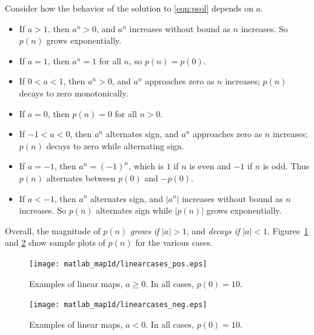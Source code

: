 % 
Consider how the behavior of the solution
to \eqref{eqn:psol} depends on $a$.
\begin{itemize}
\item If $a > 1$, then $a^n > 0$, and $a^n$ increases without
bound as $n$ increases. So $p(n)$ grows exponentially.
\item If $a = 1$, then $a^n=1$ for all $n$, so $p(n) = p(0)$.
\item If $0 < a < 1$, then $a^n > 0$, and $a^n$ approaches
zero as $n$ increases; $p(n)$ decays to zero monotonically.
\item If $a=0$, then $p(n)=0$ for all $n > 0$.
\item If $-1 < a < 0$, then $a^n$ alternates sign, and
$a^n$ approaches zero as $n$ increases;
$p(n)$  decays to zero while alternating sign.
\item If $a = -1$, then $a^n = (-1)^n$, which is $1$ if $n$
is even and $-1$ if $n$ is odd.  Thus $p(n)$ alternates
between $p(0)$ and $-p(0)$.
\item If $a < -1$, then $a^n$ alternates sign,
and $|a^n|$ increases without bound as $n$ increases.
So $p(n)$ alternates sign while $|p(n)|$ grows exponentially.
\end{itemize}
Overall, the magnitude of $p(n)$ \emph{grows if} $|a| > 1$,
and \emph{decays if} $|a| < 1$.
Figures~\ref{fig:linearcases_pos}
and \ref{fig:linearcases_neg} show sample plots of $p(n)$
for the various cases.
\begin{figure}
\centerline{%
\texttt{[image: matlab\_map1d/linearcases\_pos.eps]}
}
\caption{Examples of linear maps, $a \ge 0$. In all cases, $p(0)=10$.}
\label{fig:linearcases_pos}
\end{figure}
%
\begin{figure}
\centerline{%
\texttt{[image: matlab\_map1d/linearcases\_neg.eps]}
}
\caption{Examples of linear maps, $a < 0$. In all cases, $p(0)=10$.}
\label{fig:linearcases_neg}
\end{figure}
%

